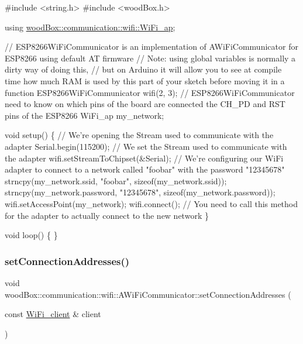 \begin{DoxyCode}
\textcolor{preprocessor}{#include <string.h>}
\textcolor{preprocessor}{#include <woodBox.h>}

\textcolor{keyword}{using} \mbox{\hyperlink{structwood_box_1_1communication_1_1wifi_1_1s__wifi__access__point}{woodBox::communication::wifi::WiFi\_ap}};

\textcolor{comment}{// ESP8266WiFiCommunicator is an implementation of AWiFiCommunicator for ESP8266 using default AT firmware}
\textcolor{comment}{// Note: using global variables is normally a dirty way of doing this,}
\textcolor{comment}{// but on Arduino it will allow you to see at compile time how much RAM is used by this part of your sketch
       before moving it in a function}
ESP8266WiFiCommunicator wifi(2, 3); \textcolor{comment}{// ESP8266WiFiCommunicator need to know on which pins of the board are
       connected the CH\_PD and RST pins of the ESP8266}
WiFi\_ap my\_network;

\textcolor{keywordtype}{void} setup() \{
  \textcolor{comment}{// We're opening the Stream used to communicate with the adapter}
  Serial.begin(115200);
  \textcolor{comment}{// We set the Stream used to communicate with the adapter}
  wifi.setStreamToChipset(&Serial);
  \textcolor{comment}{// We're configuring our WiFi adapter to connect to a network called "foobar" with the password
       "12345678"}
  strncpy(my\_network.ssid, \textcolor{stringliteral}{"foobar"}, \textcolor{keyword}{sizeof}(my\_network.ssid));
  strncpy(my\_network.password, \textcolor{stringliteral}{"12345678"}, \textcolor{keyword}{sizeof}(my\_network.password));
  wifi.setAccessPoint(my\_network);
  wifi.connect(); \textcolor{comment}{// You need to call this method for the adapter to actually connect to the new network}
\}

\textcolor{keywordtype}{void} loop() \{
\}
\end{DoxyCode}
 \mbox{\label{classwood_box_1_1communication_1_1wifi_1_1_a_wi_fi_communicator_ae0e96daf4cbeef3e646cc5af87eaa82d}} 
\subsubsection{\texorpdfstring{set\+Connection\+Addresses()}{setConnectionAddresses()}}
{\footnotesize\ttfamily void wood\+Box\+::communication\+::wifi\+::\+A\+Wi\+Fi\+Communicator\+::set\+Connection\+Addresses (\begin{DoxyParamCaption}\item[{const \mbox{\hyperlink{structwood_box_1_1communication_1_1wifi_1_1s__wifi__client}{Wi\+Fi\+\_\+client}} \&}]{client }\end{DoxyParamCaption})}

